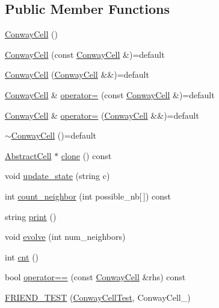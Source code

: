 \subsection*{Public Member Functions}
\begin{DoxyCompactItemize}
\item 
\hyperlink{classConwayCell_aeff597ba7adcb28d4c386d075eddb196}{Conway\-Cell} ()
\item 
\hyperlink{classConwayCell_a62b809851f5cd9acfbc07d5a0ea283f1}{Conway\-Cell} (const \hyperlink{classConwayCell}{Conway\-Cell} \&)=default
\item 
\hyperlink{classConwayCell_a84ee85ecc83a697ae5954c24294a2af8}{Conway\-Cell} (\hyperlink{classConwayCell}{Conway\-Cell} \&\&)=default
\item 
\hyperlink{classConwayCell}{Conway\-Cell} \& \hyperlink{classConwayCell_aa83d009212f52ac55e39f42f002970a0}{operator=} (const \hyperlink{classConwayCell}{Conway\-Cell} \&)=default
\item 
\hyperlink{classConwayCell}{Conway\-Cell} \& \hyperlink{classConwayCell_a951cc1ac6d81cfea066a2076953fa209}{operator=} (\hyperlink{classConwayCell}{Conway\-Cell} \&\&)=default
\item 
\hyperlink{classConwayCell_a965899766787781cf4463ab080b56cb5}{$\sim$\-Conway\-Cell} ()=default
\item 
\hyperlink{classAbstractCell}{Abstract\-Cell} $\ast$ \hyperlink{classConwayCell_a00e3f8117929e7dcbb85f71aeaa10368}{clone} () const 
\item 
void \hyperlink{classConwayCell_a6a0d34c7f90a1b76e144c891ba4541e5}{update\-\_\-state} (string c)
\item 
int \hyperlink{classConwayCell_afbd79c8a5fc7a7da5885cdc7445f5b45}{count\-\_\-neighbor} (int possible\-\_\-nb\mbox{[}$\,$\mbox{]}) const 
\item 
string \hyperlink{classConwayCell_ad8be337992eca64445ebc1259af8d4ca}{print} ()
\item 
void \hyperlink{classConwayCell_a94a403a65aac5b0c9fd69c175122151c}{evolve} (int num\-\_\-neighbors)
\item 
int \hyperlink{classConwayCell_a49c7cf05666f19c89e8a0b29a78a6d3f}{cnt} ()
\item 
bool \hyperlink{classConwayCell_a5f0061fad24ab7d11c315f3e2dfe45be}{operator==} (const \hyperlink{classConwayCell}{Conway\-Cell} \&rhs) const 
\item 
\hyperlink{classConwayCell_a2067446abf91a0e431cfbfcef78655e9}{F\-R\-I\-E\-N\-D\-\_\-\-T\-E\-S\-T} (\hyperlink{classConwayCell_aaf9203db9ae10bf69d131c17aa7bf43c}{Conway\-Cell\-Test}, Conway\-Cell\-\_)

\end{DoxyCompactItemize}
